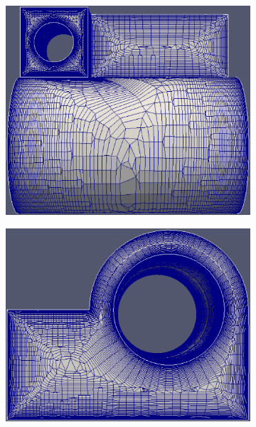 \documentclass[conf]{new-aiaa}
\begin{document}
\begin{figure}[hbt!]
\begin{subfigure}{.33\textwidth}
  \caption{}
  \label{fig-joint-side}
\end{subfigure}
\begin{subfigure}{.33\textwidth}
  \centering
  \includegraphics[width=.9\linewidth]{meshCases/joint-x0.004-g1.04-a5/top.eps}
  \caption{}
  \label{fig-joint-top}
\end{subfigure}%
\begin{subfigure}{0.33\textwidth}
	\centering
	\includegraphics[width=0.9\linewidth]{meshCases/joint-x0.004-g1.04-a5/front.eps}
	\caption{}
	\label{fig-joint-front}
\end{subfigure}%
\begin{subfigure}{0.33\textwidth}
	\centering

\end{subfigure}
\end{figure}
\end{document}
